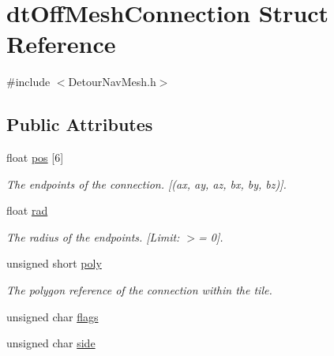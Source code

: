 \hypertarget{structdtOffMeshConnection}{}\section{dt\+Off\+Mesh\+Connection Struct Reference}
\label{structdtOffMeshConnection}


{\ttfamily \#include $<$Detour\+Nav\+Mesh.\+h$>$}

\subsection*{Public Attributes}
\begin{DoxyCompactItemize}
\item 
float \hyperlink{structdtOffMeshConnection_a1ad6f470aa15ca67e1df62d692a4efe4}{pos} \mbox{[}6\mbox{]}
\begin{DoxyCompactList}\small\item\em The endpoints of the connection. \mbox{[}(ax, ay, az, bx, by, bz)\mbox{]}. \end{DoxyCompactList}\item 
\mbox{\label{structdtOffMeshConnection_af5ea87d3e8c0d6c1bd5afeac3f954fa1}} 
float \hyperlink{structdtOffMeshConnection_af5ea87d3e8c0d6c1bd5afeac3f954fa1}{rad}
\begin{DoxyCompactList}\small\item\em The radius of the endpoints. \mbox{[}Limit\+: $>$= 0\mbox{]}. \end{DoxyCompactList}\item 
\mbox{\label{structdtOffMeshConnection_a4b6b7097d8fd55a5e7f7173a40d01325}} 
unsigned short \hyperlink{structdtOffMeshConnection_a4b6b7097d8fd55a5e7f7173a40d01325}{poly}
\begin{DoxyCompactList}\small\item\em The polygon reference of the connection within the tile. \end{DoxyCompactList}\item 
unsigned char \hyperlink{structdtOffMeshConnection_adf581af16754d8bbed1479cdf91dd82d}{flags}
\item 
\mbox{\label{structdtOffMeshConnection_a8c193e7df9998a218be48a39b2be1488}} 
unsigned char \hyperlink{structdtOffMeshConnection_a8c193e7df9998a218be48a39b2be1488}{side}

\end{DoxyCompactItemize}
